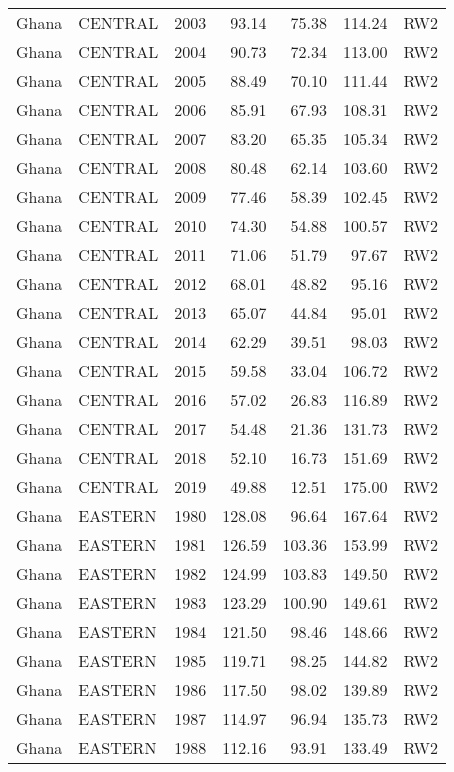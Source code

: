 \begin{longtable}{lllrrrl}
  Ghana & CENTRAL & 2003 & 93.14 & 75.38 & 114.24 & RW2 \\ 
  Ghana & CENTRAL & 2004 & 90.73 & 72.34 & 113.00 & RW2 \\ 
  Ghana & CENTRAL & 2005 & 88.49 & 70.10 & 111.44 & RW2 \\ 
  Ghana & CENTRAL & 2006 & 85.91 & 67.93 & 108.31 & RW2 \\ 
  Ghana & CENTRAL & 2007 & 83.20 & 65.35 & 105.34 & RW2 \\ 
  Ghana & CENTRAL & 2008 & 80.48 & 62.14 & 103.60 & RW2 \\ 
  Ghana & CENTRAL & 2009 & 77.46 & 58.39 & 102.45 & RW2 \\ 
  Ghana & CENTRAL & 2010 & 74.30 & 54.88 & 100.57 & RW2 \\ 
  Ghana & CENTRAL & 2011 & 71.06 & 51.79 & 97.67 & RW2 \\ 
  Ghana & CENTRAL & 2012 & 68.01 & 48.82 & 95.16 & RW2 \\ 
  Ghana & CENTRAL & 2013 & 65.07 & 44.84 & 95.01 & RW2 \\ 
  Ghana & CENTRAL & 2014 & 62.29 & 39.51 & 98.03 & RW2 \\ 
  Ghana & CENTRAL & 2015 & 59.58 & 33.04 & 106.72 & RW2 \\ 
  Ghana & CENTRAL & 2016 & 57.02 & 26.83 & 116.89 & RW2 \\ 
  Ghana & CENTRAL & 2017 & 54.48 & 21.36 & 131.73 & RW2 \\ 
  Ghana & CENTRAL & 2018 & 52.10 & 16.73 & 151.69 & RW2 \\ 
  Ghana & CENTRAL & 2019 & 49.88 & 12.51 & 175.00 & RW2 \\ 
  Ghana & EASTERN & 1980 & 128.08 & 96.64 & 167.64 & RW2 \\ 
  Ghana & EASTERN & 1981 & 126.59 & 103.36 & 153.99 & RW2 \\ 
  Ghana & EASTERN & 1982 & 124.99 & 103.83 & 149.50 & RW2 \\ 
  Ghana & EASTERN & 1983 & 123.29 & 100.90 & 149.61 & RW2 \\ 
  Ghana & EASTERN & 1984 & 121.50 & 98.46 & 148.66 & RW2 \\ 
  Ghana & EASTERN & 1985 & 119.71 & 98.25 & 144.82 & RW2 \\ 
  Ghana & EASTERN & 1986 & 117.50 & 98.02 & 139.89 & RW2 \\ 
  Ghana & EASTERN & 1987 & 114.97 & 96.94 & 135.73 & RW2 \\ 
  Ghana & EASTERN & 1988 & 112.16 & 93.91 & 133.49 & RW2 \\ 

\end{longtable}
